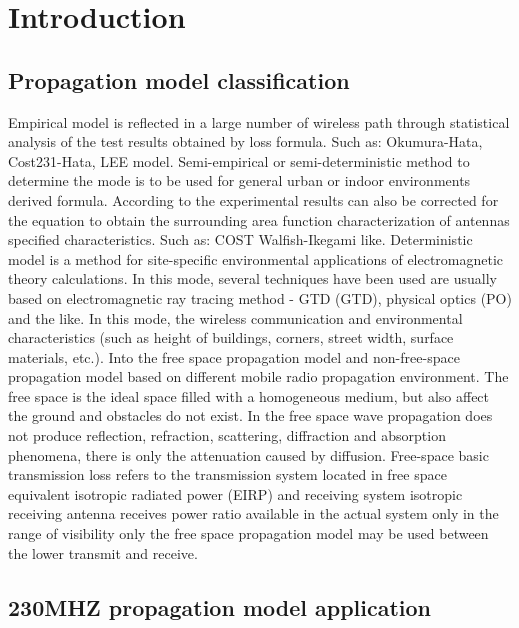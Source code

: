 \documentclass[runningheads,a4paper]{llncs}
\begin{document}
\section{Introduction}
\subsection{Propagation model classification}

Empirical model is reflected in a large number of wireless path through statistical analysis of the test results obtained by loss formula. Such as: Okumura-Hata, Cost231-Hata, LEE model\cite{dd}. 
Semi-empirical or semi-deterministic method to determine the mode is to be used for general urban or indoor environments derived formula. According to the experimental results can also be corrected for the equation to obtain the surrounding area function characterization of antennas specified characteristics. Such as: COST Walfish-Ikegami like. 
Deterministic model is a method for site-specific environmental applications of electromagnetic theory calculations. In this mode, several techniques have been used are usually based on electromagnetic ray tracing method - GTD (GTD)\cite{ee}, physical optics (PO) and the like. In this mode, the wireless communication and environmental characteristics (such as height of buildings, corners, street width, surface materials, etc.). 
Into the free space propagation model and non-free-space propagation model based on different mobile radio propagation environment. 
The free space is the ideal space filled with a homogeneous medium, but also affect the ground and obstacles do not exist. In the free space wave propagation does not produce reflection, refraction, scattering, diffraction and absorption phenomena, there is only the attenuation caused by diffusion. Free-space basic transmission loss refers to the transmission system located in free space equivalent isotropic radiated power (EIRP) and receiving system isotropic receiving antenna\cite{cs02} receives power ratio available in the actual system only in the range of visibility only the free space propagation model may be used between the lower transmit and receive.

\subsection{230MHZ propagation model application}
\end{document}
